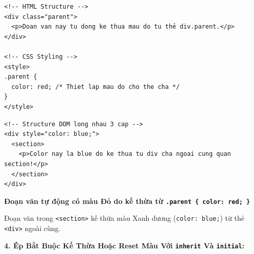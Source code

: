 \documentclass[11pt,oneside]{book}
\newcommand{\codeinline}[1]{\textcolor{accentOrange}{\texttt{#1}}}
\begin{document}
\begin{codeWindow}
\begin{lstlisting}[language=HTML5]
<!-- HTML Structure -->
<div class="parent">
  <p>Doan van nay tu dong ke thua mau do tu thẻ div.parent.</p>
</div>

<!-- CSS Styling -->
<style>
.parent {
  color: red; /* Thiet lap mau do cho the cha */
}
</style>
\end{lstlisting}
\end{codeWindow}

\begin{codeWindow}
\begin{lstlisting}[language=HTML5]
<!-- Structure DOM long nhau 3 cap -->
<div style="color: blue;">
  <section>
    <p>Color nay la blue do ke thua tu div cha ngoai cung quan section!</p>
  </section>
</div>
\end{lstlisting}
\end{codeWindow}

\begin{browserWindow}
\vspace{2pt}
\begin{tcolorbox}[
    enhanced,
    colback=white,
    colframe=gray!30,
    arc=6pt, boxrule=0.8pt,
    top=10pt, bottom=10pt, left=12pt, right=12pt
]
  {\sffamily\bfseries\color{red!80!black} Đoạn văn tự động có màu Đỏ do kế thừa từ \codeinline{.parent \{ color: red; \}}}\\[6pt]
  
  \begin{tcolorbox}[colback=blue!5, colframe=blue!40, arc=4pt, boxrule=0.6pt, top=6pt, bottom=6pt, left=8pt, right=8pt, fontupper=\sffamily\bfseries\color{blue!80!black}]
    Đoạn văn trong \codeinline{<section>} kế thừa màu Xanh dương (\codeinline{color: blue;}) từ thẻ \codeinline{<div>} ngoài cùng.
  \end{tcolorbox}
\end{tcolorbox}
\end{browserWindow}

\textbf{4. Ép Bắt Buộc Kế Thừa Hoặc Reset Màu Với \codeinline{inherit} Và \codeinline{initial}:}
\end{document}
